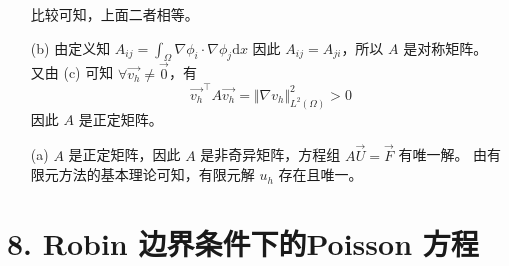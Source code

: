 \documentclass[a4paper]{article}
\begin{document}
\begin{enumerate}
\begin{equation}
            \end{equation}  
            比较可知，上面二者相等。
    \item[(b)] 由定义知 $A_{ij} = \int_{\Omega} \nabla \phi_i \cdot \nabla \phi_j \text{d}x$ 
                因此 $A_{ij} = A_{ji}$，所以 $A$ 是对称矩阵。\\
                又由 (c) 可知 $\forall \vec{v_h} \neq \vec{0}$，有
                \begin{equation}
                    \vec{v_h}^\top A \vec{v_h}
                    = \Vert \nabla v_h \Vert^2_{L^2(\Omega)} > 0
                \end{equation}
                因此 $A$ 是正定矩阵。
    \item[(a)] $A$ 是正定矩阵，因此 $A$ 是非奇异矩阵，方程组 $A\vec{U}=\vec{F}$ 有唯一解。
                由有限元方法的基本理论可知，有限元解 $u_h$ 存在且唯一。
    
\end{enumerate}

\section*{8. Robin 边界条件下的Poisson 方程}
\end{document}
